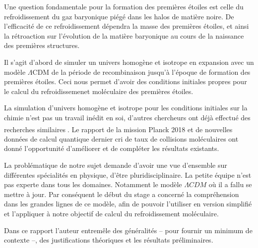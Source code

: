 \documentclass[10pt, a4paper]{report}
\numberwithin{equation}{subsection}
\begin{document}
Une question fondamentale pour la formation des premières étoiles est celle du refroidissement du gaz baryonique piégé dans les halos de matière noire. De l'efficacité de ce refroidissement dépendra la masse des premières étoiles, et ainsi la rétroaction sur l'évolution de la matière baryonique au cours de la naissance des premières structures. 

Il s'agit d'abord de simuler un univers homogène et isotrope en expansion avec un modèle $\Lambda$CDM de la période de recombinaison jusqu'à l'époque de formation des premières étoiles. Ceci nous permet d'avoir des conditions initiales propres pour le calcul du refroidissemenet moléculaire des premières étoiles.

La simulation d'univers homogène et isotrope pour les conditions initiales sur la chimie n'est pas un travail inédit en soi, d'autres chercheurs ont déjà effectué des recherches similaires\textsuperscript{\cite{Coppola} \cite{Flower}}. Le rapport de la mission Planck 2018\textsuperscript{\cite{Planck2018}} et de nouvelles données de calcul quantique dernier cri de taux de collisions moléculaires ont donné l'opportunité d'améliorer et de compléter les résultats existants. 

La problématique de notre sujet demande d'avoir une vue d'ensemble sur différentes spécialités en physique, d'être pluridisciplinaire. La petite équipe n'est pas experte dans tous les domaines. Notamment le modèle $\Lambda CDM$ où il a fallu se mettre à jour. Par conséquent le début du stage a concerné la compréhension dans les grandes lignes de ce modèle, afin de pouvoir l'utiliser en version simplifié et l'appliquer à notre objectif de calcul du refroidissement moléculaire.

Dans ce rapport l'auteur entremêle des généralités -- pour fournir un minimum de contexte --, des justifications théoriques et les résultats préliminaires.
\end{document}
